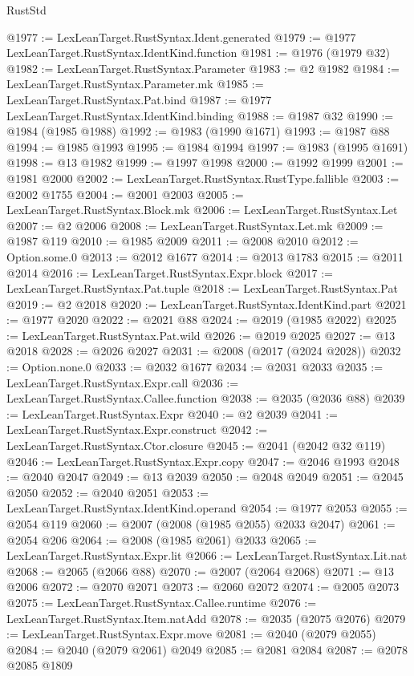 \begin{lexlean}{RustStd}
\begin{coremodule}
@1977 := LexLeanTarget.RustSyntax.Ident.generated
@1979 := @1977 LexLeanTarget.RustSyntax.IdentKind.function
@1981 := @1976 (@1979 @32)
@1982 := LexLeanTarget.RustSyntax.Parameter
@1983 := @2 @1982
@1984 := LexLeanTarget.RustSyntax.Parameter.mk
@1985 := LexLeanTarget.RustSyntax.Pat.bind
@1987 := @1977 LexLeanTarget.RustSyntax.IdentKind.binding
@1988 := @1987 @32
@1990 := @1984 (@1985 @1988)
@1992 := @1983 (@1990 @1671)
@1993 := @1987 @88
@1994 := @1985 @1993
@1995 := @1984 @1994
@1997 := @1983 (@1995 @1691)
@1998 := @13 @1982
@1999 := @1997 @1998
@2000 := @1992 @1999
@2001 := @1981 @2000
@2002 := LexLeanTarget.RustSyntax.RustType.fallible
@2003 := @2002 @1755
@2004 := @2001 @2003
@2005 := LexLeanTarget.RustSyntax.Block.mk
@2006 := LexLeanTarget.RustSyntax.Let
@2007 := @2 @2006
@2008 := LexLeanTarget.RustSyntax.Let.mk
@2009 := @1987 @119
@2010 := @1985 @2009
@2011 := @2008 @2010
@2012 := Option.some.{0}
@2013 := @2012 @1677
@2014 := @2013 @1783
@2015 := @2011 @2014
@2016 := LexLeanTarget.RustSyntax.Expr.block
@2017 := LexLeanTarget.RustSyntax.Pat.tuple
@2018 := LexLeanTarget.RustSyntax.Pat
@2019 := @2 @2018
@2020 := LexLeanTarget.RustSyntax.IdentKind.part
@2021 := @1977 @2020
@2022 := @2021 @88
@2024 := @2019 (@1985 @2022)
@2025 := LexLeanTarget.RustSyntax.Pat.wild
@2026 := @2019 @2025
@2027 := @13 @2018
@2028 := @2026 @2027
@2031 := @2008 (@2017 (@2024 @2028))
@2032 := Option.none.{0}
@2033 := @2032 @1677
@2034 := @2031 @2033
@2035 := LexLeanTarget.RustSyntax.Expr.call
@2036 := LexLeanTarget.RustSyntax.Callee.function
@2038 := @2035 (@2036 @88)
@2039 := LexLeanTarget.RustSyntax.Expr
@2040 := @2 @2039
@2041 := LexLeanTarget.RustSyntax.Expr.construct
@2042 := LexLeanTarget.RustSyntax.Ctor.closure
@2045 := @2041 (@2042 @32 @119)
@2046 := LexLeanTarget.RustSyntax.Expr.copy
@2047 := @2046 @1993
@2048 := @2040 @2047
@2049 := @13 @2039
@2050 := @2048 @2049
@2051 := @2045 @2050
@2052 := @2040 @2051
@2053 := LexLeanTarget.RustSyntax.IdentKind.operand
@2054 := @1977 @2053
@2055 := @2054 @119
@2060 := @2007 (@2008 (@1985 @2055) @2033 @2047)
@2061 := @2054 @206
@2064 := @2008 (@1985 @2061) @2033
@2065 := LexLeanTarget.RustSyntax.Expr.lit
@2066 := LexLeanTarget.RustSyntax.Lit.nat
@2068 := @2065 (@2066 @88)
@2070 := @2007 (@2064 @2068)
@2071 := @13 @2006
@2072 := @2070 @2071
@2073 := @2060 @2072
@2074 := @2005 @2073
@2075 := LexLeanTarget.RustSyntax.Callee.runtime
@2076 := LexLeanTarget.RustSyntax.Item.natAdd
@2078 := @2035 (@2075 @2076)
@2079 := LexLeanTarget.RustSyntax.Expr.move
@2081 := @2040 (@2079 @2055)
@2084 := @2040 (@2079 @2061) @2049
@2085 := @2081 @2084
@2087 := @2078 @2085 @1809

\end{coremodule}
\end{lexlean}
